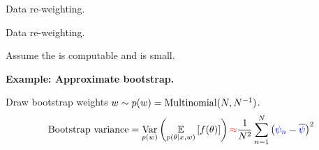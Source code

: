 \begin{frame}{Data re-weighting.}
%
\end{frame}



\begin{frame}[t]{Data re-weighting.}


Assume the  is computable and  is small.
%
\expansion{}


%
%

\pause
\textbf{Example: Approximate bootstrap.}

Draw bootstrap
weights $w \sim p(w) = \textrm{Multinomial}(N, N^{-1})$.
%
\begin{align*}
%
\textrm{Bootstrap variance} =
\var{\p(\w)}{\expect{p(\theta \vert \x, w)}{f(\theta)}}
\red{\approx} \frac{1}{N^2} \sumn \left(\blue{\infl_n} -
\overline{\blue{\infl}}
    \right)^2
%
\end{align*}
%



\end{frame}
